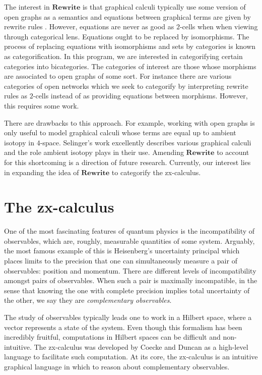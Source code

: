 \documentclass[11pt]{amsart}
\newcommand{\cat}[1]{\mathbf{#1}}
\theoremstyle{remark}
\theoremstyle{definition}
\begin{document}
The interest in $\cat{Rewrite}$ is that graphical calculi typically use some version of open graphs as a semantics and equations between graphical terms are given by rewrite rules \cite{Selinger_GraphicsMonCats}. However, equations are never as good as $2$-cells when when viewing through categorical lens.  Equations ought to be replaced by isomorphisms. The process of replacing equations with isomorphisms and sets by categories is known as categorification. In this program, we are interested in categorifying certain categories into bicategories. The categories of interest are those whose morphisms are associated to open graphs of some sort. For instance there are various categories of open networks \cite{Dixon_OpenGraphs,Fong_AlgOpenSystems,Pollard_OpenMarkov} which we seek to categorify by interpreting rewrite rules as $2$-cells instead of as providing equations between morphisms.  However, this requires some work.

There are drawbacks to this approach. For example, working with open graphs is only useful to model graphical calculi whose terms are equal up to ambient isotopy in $4$-space. Selinger's work \cite{Selinger_GraphicsMonCats} excellently describes various graphical calculi and the role ambient isotopy plays in their use. Amending $\cat{Rewrite}$ to account for this shortcoming is a direction of future research.  Currently, our interest lies in expanding the idea of $\cat{Rewrite}$ to categorify the zx-calculus.

\section{The zx-calculus}
\label{sec:ZxCalc}

One of the most fascinating features of quantum physics is the incompatibility of observables, which are, roughly, measurable quantities of some system.  Arguably, the most famous example of this is Heisenberg's uncertainty principal which places limits to the precision that one can simultaneously measure a pair of observables: position and momentum.  There are different levels of incompatibility amongst pairs of observables. When such a pair is maximally incompatible, in the sense that knowing the one with complete precision implies total uncertainty of the other, we say they are \emph{complementary observables}.  

The study of observables typically leads one to work in a Hilbert space, where a vector represents a state of the system. Even though this formalism has been incredibly fruitful, computations in Hilbert spaces can be difficult and non-intuitive. The zx-calculus was developed by Coecke and Duncan \cite{CoeckeDuncan_QuantumObs} as a high-level language to facilitate such computation.  At its core, the zx-calculus is an intuitive graphical language in which to reason about complementary observables. 
\end{document}
